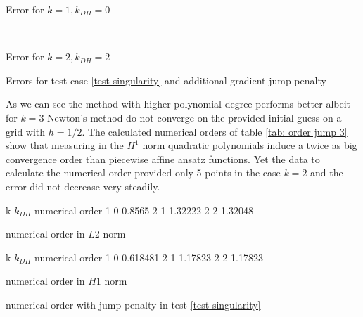 \begin{table}[H]
\begin{subtable}[b]{0.45\textwidth}
  	\centering
  	\pgfplotstabletypeset[columns={iterations, l2error, h1error,N},
  	every row 0 column 0/.style={set content=init},
  	]{\MAThreeJumpdegOneZero}
  	\caption{Error for $k=1, k_{DH}=0$}
  \end{subtable}
  ~
	\begin{subtable}[b]{0.45\textwidth}
		\centering
		  		\pgfplotstabletypeset[
		columns={iterations, l2error, h1error,N},
		    every row 0 column 0/.style={set content=init},
		]{\MAThreeJumpdegTwoTwo}
    	\caption{Error for $k=2, k_{DH}=2$}
   \end{subtable}
 	\caption{Errors for test case \ref{test singularity} and additional gradient jump penalty}
	\label{tab: l2 errors test 3 jump}
\end{table}
As we can see the method with higher polynomial degree performs better albeit for $k=3$ Newton's method do not converge on the provided initial guess on a grid with $h=1/2$. The calculated numerical orders of table \ref{tab: order jump 3} show that measuring in the $H^1$ norm quadratic polynomials induce a twice as big convergence order than piecewise affine ansatz functions. Yet the data to calculate the numerical order provided only 5 points in the case $k=2$ and the error did not decrease very steadily.
\begin{table}[H]
\centering
\begin{subtable}[b]{0.45\textwidth}
	\pgfplotstabletypeset
	{
		k $k_{DH}$ {numerical order}
		1 0 0.8565
		2 1 1.32222
		2 2 1.32048
	}
	\caption{numerical order in $L2$ norm}
	\end{subtable}
	\begin{subtable}[b]{0.45\textwidth}
	\pgfplotstabletypeset
	{
		k $k_{DH}$ {numerical order}
		1 0 0.618481
		2 1 1.17823
		2 2 1.17823
	}
	\caption{numerical order in $H1$ norm}
	\end{subtable}
	\caption{numerical order with jump penalty in test \ref{test singularity}}
\label{tab: order jump 3}
\end{table}

